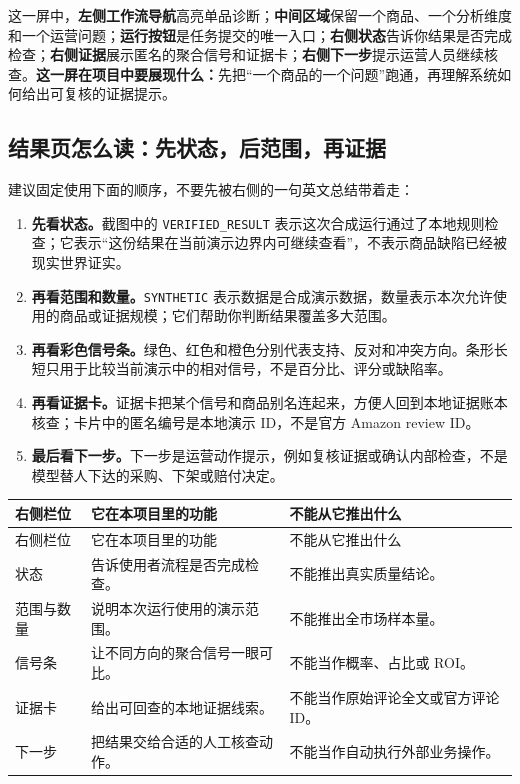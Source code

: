 这一屏中，\textbf{左侧工作流导航}高亮单品诊断；\textbf{中间区域}保留一个商品、一个分析维度和一个运营问题；\textbf{运行按钮}是任务提交的唯一入口；\textbf{右侧状态}告诉你结果是否完成检查；\textbf{右侧证据}展示匿名的聚合信号和证据卡；\textbf{右侧下一步}提示运营人员继续核查。\textbf{这一屏在项目中要展现什么：}先把“一个商品的一个问题”跑通，再理解系统如何给出可复核的证据提示。

\subsection*{结果页怎么读：先状态，后范围，再证据}

建议固定使用下面的顺序，不要先被右侧的一句英文总结带着走：

\begin{enumerate}
  \item \textbf{先看状态。}截图中的 \texttt{VERIFIED\_RESULT} 表示这次合成运行通过了本地规则检查；它表示“这份结果在当前演示边界内可继续查看”，不表示商品缺陷已经被现实世界证实。
  \item \textbf{再看范围和数量。}\texttt{SYNTHETIC} 表示数据是合成演示数据，数量表示本次允许使用的商品或证据规模；它们帮助你判断结果覆盖多大范围。
  \item \textbf{再看彩色信号条。}绿色、红色和橙色分别代表支持、反对和冲突方向。条形长短只用于比较当前演示中的相对信号，不是百分比、评分或缺陷率。
  \item \textbf{再看证据卡。}证据卡把某个信号和商品别名连起来，方便人回到本地证据账本核查；卡片中的匿名编号是本地演示 ID，不是官方 Amazon review ID。
  \item \textbf{最后看下一步。}下一步是运营动作提示，例如复核证据或确认内部检查，不是模型替人下达的采购、下架或赔付决定。
\end{enumerate}

\begin{longtable}{>{\raggedright\arraybackslash}p{}>{\raggedright\arraybackslash}p{}>{\raggedright\arraybackslash}p{}}
\toprule
右侧栏位 & 它在本项目里的功能 & 不能从它推出什么 \\
\midrule
\endfirsthead
\toprule
右侧栏位 & 它在本项目里的功能 & 不能从它推出什么 \\
\midrule
\endhead
状态 & 告诉使用者流程是否完成检查。 & 不能推出真实质量结论。 \\
范围与数量 & 说明本次运行使用的演示范围。 & 不能推出全市场样本量。 \\
信号条 & 让不同方向的聚合信号一眼可比。 & 不能当作概率、占比或 ROI。 \\
证据卡 & 给出可回查的本地证据线索。 & 不能当作原始评论全文或官方评论 ID。 \\
下一步 & 把结果交给合适的人工核查动作。 & 不能当作自动执行外部业务操作。 \\
\bottomrule
\end{longtable}

